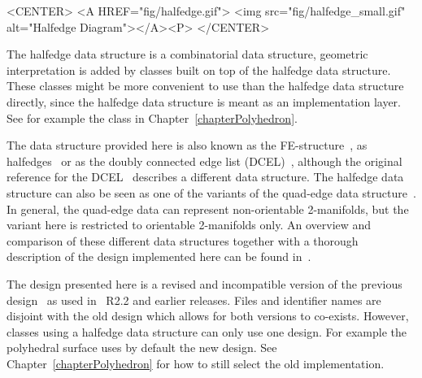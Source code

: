 
\begin{ccHtmlOnly}
    <CENTER>
    <A HREF="fig/halfedge.gif">
        <img src="fig/halfedge_small.gif" alt="Halfedge Diagram"></A><P>
    </CENTER>
\end{ccHtmlOnly}

The halfedge data structure is a combinatorial data structure,
geometric interpretation is added by classes built on top of the
halfedge data structure.  These classes might be more convenient to
use than the halfedge data structure directly, since the halfedge data
structure is meant as an implementation layer.  See for example the
 class in Chapter~\ref{chapterPolyhedron}.

The data structure provided here is also known as the
FE-structure~\cite{w-ebdss-85}, as
halfedges~\cite{m-ism-88,cgal:bfh-mgedm-95} or as the doubly connected edge
list (DCEL)~\cite{bkos-cgaa-97}, although the original reference for
the DCEL~\cite{mp-fitcp-78} describes a different data structure. The
halfedge data structure can also be seen as one of the variants of the
quad-edge data structure~\cite{gs-pmgsc-85}. In general, the quad-edge
data can represent non-orientable 2-manifolds, but the variant here is
restricted to orientable 2-manifolds only. An overview and comparison
of these different data structures together with a thorough
description of the design implemented here can be found
in~\cite{k-ugpdd-99}.  

The design presented here is a revised and incompatible version of the
previous design~\cite{k-ddsps-98} as used in \cgal\ R2.2 and earlier
releases. Files and identifier names are disjoint with the old design
which allows for both versions to co-exists. However, classes using a
halfedge data structure can only use one design. For example the
polyhedral surface  uses by default the new
design. See Chapter~\ref{chapterPolyhedron} for how to still select
the old implementation.

